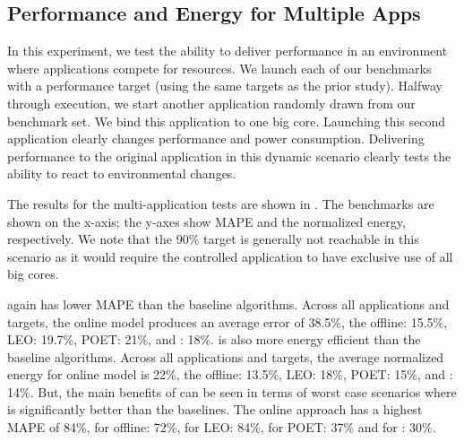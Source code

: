 



\subsection{Performance and Energy for Multiple Apps}
In this experiment, we test the ability to deliver performance in an
environment where applications compete for resources.  We launch each
of our benchmarks with a performance target (using the same targets as
the prior study).  Halfway through execution, we start another
application randomly drawn from our benchmark set.  We bind this
application to one big core.  Launching this second application
clearly changes performance and power consumption.  Delivering
performance to the original application in this dynamic scenario
clearly tests the ability to react to environmental changes.

The results for the multi-application tests are shown in
.  The benchmarks are shown
on the x-axis; the y-axes show MAPE and the normalized energy,
respectively.  We note that the 90\% target is generally not reachable
in this scenario as it would require the controlled application to
have exclusive use of all big cores.


\SYSTEM{} again has lower MAPE than the baseline algorithms. Across
all applications and targets, the online model produces an average
error of 38.5\%, the offline: 15.5\%, LEO: 19.7\%, POET: 21\%, and \SYSTEM{}:
18\%. \SYSTEM{} is also more energy efficient than the baseline algorithms. Across
all applications and targets, the average normalized energy for online model is 22\%, the offline: 13.5\%, LEO: 18\%, POET: 15\%, and \SYSTEM{}: 14\%. But, the main benefits of \SYSTEM{} can be seen in terms of worst case scenarios where \SYSTEM{} is significantly better than the baselines. The online approach has a highest MAPE
of 84\%, for offline: 72\%, for LEO: 84\%, for POET: 37\% and for \SYSTEM{}: 30\%.  

